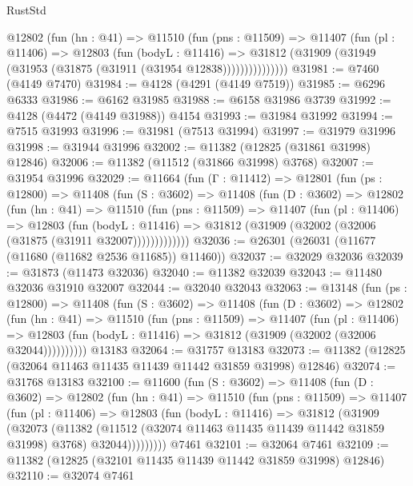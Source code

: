 \begin{lexlean}{RustStd}
\begin{coremodule}
            @12802
              (fun (hn : @41) =>
              @11510
                (fun (pns : @11509) =>
                @11407
                  (fun (pl : @11406) =>
                  @12803
                    (fun (bodyL : @11416) =>
                    @31812 (@31909 (@31949 (@31953 (@31875 (@31911 (@31954 @12838)))))))))))))))
@31981 := @7460 (@4149 @7470)
@31984 := @4128 (@4291 (@4149 @7519))
@31985 := @6296 @6333
@31986 := @6162 @31985
@31988 := @6158 @31986 @3739
@31992 := @4128 (@4472 (@4149 @31988)) @4154
@31993 := @31984 @31992
@31994 := @7515 @31993
@31996 := @31981 (@7513 @31994)
@31997 := @31979 @31996
@31998 := @31944 @31996
@32002 := @11382 (@12825 (@31861 @31998) @12846)
@32006 := @11382 (@11512 (@31866 @31998) @3768)
@32007 := @31954 @31996
@32029 := @11664
    (fun (Γ : @11412) =>
    @12801
      (fun (ps : @12800) =>
      @11408
        (fun (S : @3602) =>
        @11408
          (fun (D : @3602) =>
          @12802
            (fun (hn : @41) =>
            @11510
              (fun (pns : @11509) =>
              @11407
                (fun (pl : @11406) =>
                @12803
                  (fun (bodyL : @11416) =>
                  @31812 (@31909 (@32002 (@32006 (@31875 (@31911 @32007)))))))))))))
@32036 := @26301 (@26031 (@11677 (@11680 (@11682 @2536 @11685)) @11460))
@32037 := @32029 @32036
@32039 := @31873 (@11473 @32036)
@32040 := @11382 @32039
@32043 := @11480 @32036 @31910 @32007
@32044 := @32040 @32043
@32063 := @13148
    (fun (ps : @12800) =>
    @11408
      (fun (S : @3602) =>
      @11408
        (fun (D : @3602) =>
        @12802
          (fun (hn : @41) =>
          @11510
            (fun (pns : @11509) =>
            @11407
              (fun (pl : @11406) =>
              @12803 (fun (bodyL : @11416) => @31812 (@31909 (@32002 (@32006 @32044))))))))))
    @13183
@32064 := @31757 @13183
@32073 := @11382 (@12825 (@32064 @11463 @11435 @11439 @11442 @31859 @31998) @12846)
@32074 := @31768 @13183
@32100 := @11600
    (fun (S : @3602) =>
    @11408
      (fun (D : @3602) =>
      @12802
        (fun (hn : @41) =>
        @11510
          (fun (pns : @11509) =>
          @11407
            (fun (pl : @11406) =>
            @12803
              (fun (bodyL : @11416) =>
              @31812
                (@31909
                  (@32073
                    (@11382
                      (@11512 (@32074 @11463 @11435 @11439 @11442 @31859 @31998) @3768)
                      @32044)))))))))
    @7461
@32101 := @32064 @7461
@32109 := @11382 (@12825 (@32101 @11435 @11439 @11442 @31859 @31998) @12846)
@32110 := @32074 @7461

\end{coremodule}
\end{lexlean}
